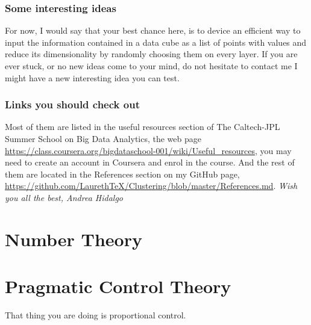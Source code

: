 \documentclass[11pt,fleqn]{book} %
\begin{document}
\subsection{Some interesting ideas}

For now, I would say that your best chance here, is to device an efficient way to input the information contained in a data cube as a list of points with values and reduce its dimensionality by randomly choosing them on every layer. If you are ever stuck, or no new ideas come to your mind, do not hesitate to contact me I might have a new interesting idea you can test.

\subsection{Links you should check out}
Most of them are listed in the useful resources section of The Caltech-JPL Summer School on Big Data Analytics, the web page \url{https://class.coursera.org/bigdataschool-001/wiki/Useful_resources}, you may need to create an account in Coursera and enrol in the course. And the rest of them are located in the References section on my GitHub page, \url{https://github.com/LaurethTeX/Clustering/blob/master/References.md}.
\vfill
\textit{Wish you all the best, Andrea Hidalgo}

\chapter{Number Theory}

\chapter{Pragmatic Control Theory}

That thing you are doing is proportional control.
\end{document}
